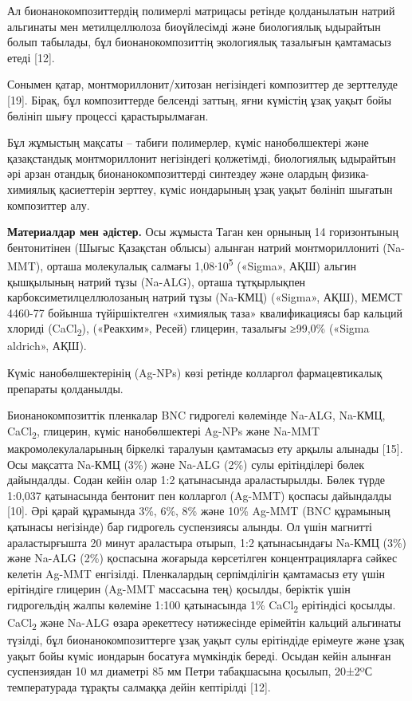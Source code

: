 \begin{multicols}{2}
Ал бионанокомпозиттердің полимерлі матрицасы ретінде қолданылатын натрий
альгинаты мен метилцеллюлоза биоүйлесімді және биологиялық ыдырайтын
болып табылады, бұл бионанокомпозиттің экологиялық тазалығын қамтамасыз
етеді {[}12{]}.

Сонымен қатар, монтмориллонит/хитозан негізіндегі композиттер де
зерттелуде {[}19{]}. Бірақ, бұл композиттерде белсенді заттың, яғни
күмістің ұзақ уақыт бойы бөлініп шығу процессі қарастырылмаған.

Бұл жұмыстың мақсаты -- табиғи полимерлер, күміс нанобөлшектері және
қазақстандық монтмориллонит негізіндегі қолжетімді, биологиялық
ыдырайтын әрі арзан отандық бионанокомпозиттерді синтездеу және олардың
физика-химиялық қасиеттерін зерттеу, күміс иондарының ұзақ уақыт бөлініп
шығатын композиттер алу.

{\bfseries Материалдар мен әдістер.} Осы жұмыста Таган кен орнының 14
горизонтының бентонитінен (Шығыс Қазақстан облысы) алынған натрий
монтмориллониті (Na-MMT), орташа молекулалық салмағы
1,08∙10\textsuperscript{5} («Sigma», АҚШ) альгин қышқылының натрий тұзы
(Na-ALG), орташа тұтқырлықпен карбоксиметилцеллюлозаның натрий тұзы
(Na-КМЦ) («Sigma», АҚШ), МЕМСТ 4460-77 бойынша түйіршіктелген «химиялық
таза» квалификациясы бар кальций хлориді (CaCl\textsubscript{2}),
(«Реакхим», Ресей) глицерин, тазалығы ≥99,0\% («Sigma aldrich», АҚШ).

Күміс нанобөлшектерінің (Ag-NPs) көзі ретінде колларгол фармацевтикалық
препараты қолданылды.

Бионанокомпозиттік пленкалар BNC гидрогелі көлемінде Na-ALG, Na-КМЦ,
CaCl\textsubscript{2}, глицерин, күміс нанобөлшектері Ag-NPs және Na-MMT
макромолекулаларының біркелкі таралуын қамтамасыз ету арқылы алынады
{[}15{]}. Осы мақсатта Na-КМЦ (3\%) және Na-ALG (2\%) сулы ерітінділері
бөлек дайындалды. Содан кейін олар 1:2 қатынасында араластырылды. Бөлек
түрде 1:0,037 қатынасында бентонит пен колларгол (Ag-MMT) қоспасы
дайындалды {[}10{]}. Әрі қарай құрамында 3\%, 6\%, 8\% және 10\% Ag-MMT
(BNC құрамының қатынасы негізінде) бар гидрогель суспензиясы алынды. Ол
үшін магнитті араластырғышта 20 минут араластыра отырып, 1:2
қатынасындағы Na-КМЦ (3\%) және Na-ALG (2\%) қоспасына жоғарыда
көрсетілген концентрацияларға сәйкес келетін Ag-MMT енгізілді.
Пленкалардың серпімділігін қамтамасыз ету үшін ерітіндіге глицерин
(Ag-MMT массасына тең) қосылды, беріктік үшін гидрогельдің жалпы
көлеміне 1:100 қатынасында 1\% CaCl\textsubscript{2} ерітіндісі қосылды.
CaCl\textsubscript{2} және Na-ALG өзара әрекеттесу нәтижесінде ерімейтін
кальций альгинаты түзілді, бұл бионанокомпозиттерге ұзақ уақыт сулы
ерітіндіде ерімеуге және ұзақ уақыт бойы күміс иондарын босатуға
мүмкіндік береді. Осыдан кейін алынған суспензиядан 10 мл диаметрі 85 мм
Петри табақшасына қосылып, 20±2ºС температурада тұрақты салмаққа дейін
кептірілді {[}12{]}.


\end{multicols}
